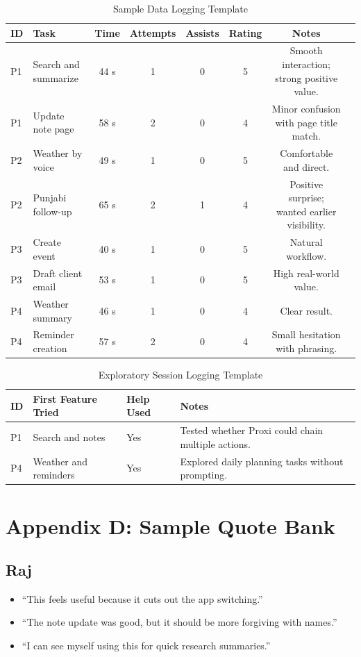 \documentclass[12pt, titlepage]{article}
\begin{document}
\begin{table}[H]
\centering
\caption{Sample Data Logging Template}
\begin{tabularx}{\textwidth}{p{1.1cm}p{2.6cm}cccccX}
\toprule
ID & Task & Time & Attempts & Assists & Rating & Notes \\
\midrule
P1 & Search and summarize & 44 s & 1 & 0 & 5 &
Smooth interaction; strong positive value. \\
P1 & Update note page & 58 s & 2 & 0 & 4 &
Minor confusion with page title match. \\
P2 & Weather by voice & 49 s & 1 & 0 & 5 &
Comfortable and direct. \\
P2 & Punjabi follow-up & 65 s & 2 & 1 & 4 &
Positive surprise; wanted earlier visibility. \\
P3 & Create event & 40 s & 1 & 0 & 5 & Natural workflow. \\
P3 & Draft client email & 53 s & 1 & 0 & 5 &
High real-world value. \\
P4 & Weather summary & 46 s & 1 & 0 & 4 & Clear result. \\
P4 & Reminder creation & 57 s & 2 & 0 & 4 &
Small hesitation with phrasing. \\
\bottomrule
\end{tabularx}
\end{table}

\begin{table}[H]
\centering
\caption{Exploratory Session Logging Template}
\begin{tabularx}{\textwidth}{p{1.2cm}p{2.8cm}p{2cm}X}
\toprule
ID & First Feature Tried & Help Used & Notes \\
\midrule
P1 & Search and notes & Yes &
Tested whether Proxi could chain multiple actions. \\
P4 & Weather and reminders & Yes &
Explored daily planning tasks without prompting. \\
\bottomrule
\end{tabularx}
\end{table}

\section{Appendix D: Sample Quote Bank}

\subsection{Raj}

\begin{itemize}
    \item ``This feels useful because it cuts out the app switching.''
    \item ``The note update was good, but it should be more forgiving
    with names.''
    \item ``I can see myself using this for quick research summaries.''
\end{itemize}
\end{document}
